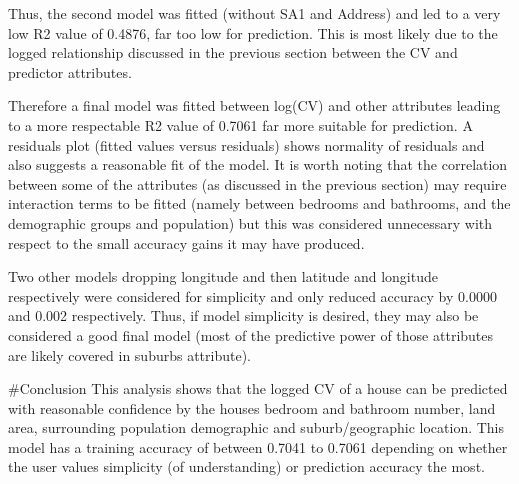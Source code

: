 \documentclass[
]{article}
\begin{document}
Thus, the second model was fitted (without SA1 and Address) and led to a
very low R2 value of 0.4876, far too low for prediction. This is most
likely due to the logged relationship discussed in the previous section
between the CV and predictor attributes.

Therefore a final model was fitted between log(CV) and other attributes
leading to a more respectable R2 value of 0.7061 far more suitable for
prediction. A residuals plot (fitted values versus residuals) shows
normality of residuals and also suggests a reasonable fit of the model.
It is worth noting that the correlation between some of the attributes
(as discussed in the previous section) may require interaction terms to
be fitted (namely between bedrooms and bathrooms, and the demographic
groups and population) but this was considered unnecessary with respect
to the small accuracy gains it may have produced.

Two other models dropping longitude and then latitude and longitude
respectively were considered for simplicity and only reduced accuracy by
0.0000 and 0.002 respectively. Thus, if model simplicity is desired,
they may also be considered a good final model (most of the predictive
power of those attributes are likely covered in suburbs attribute).

\#Conclusion This analysis shows that the logged CV of a house can be
predicted with reasonable confidence by the houses bedroom and bathroom
number, land area, surrounding population demographic and
suburb/geographic location. This model has a training accuracy of
between 0.7041 to 0.7061 depending on whether the user values simplicity
(of understanding) or prediction accuracy the most.
\end{document}
